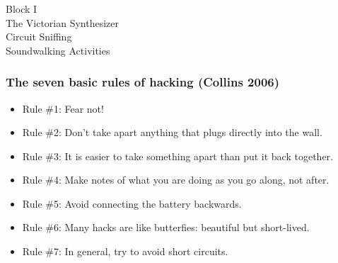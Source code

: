 \documentclass[screen, aspectratio=169]{beamer}
\begin{document}
\usebackgroundtemplate{}
\begin{frame}
\frametitle{}
{\huge Block I\\ The Victorian Synthesizer\\ Circuit Sniffing\\ Soundwalking Activities}
\end{frame}

\begin{frame}
  \frametitle{The seven basic rules of hacking (Collins 2006)}
        \begin{itemize}
	\item Rule \#1: Fear not!
	\item Rule \#2: Don't take apart anything that plugs directly into the wall.
	\item Rule \#3: It is easier to take something apart than put it back together.
	\item Rule \#4: Make notes of what you are doing as you go along, not after.
	\item Rule \#5: Avoid connecting the battery backwards.
	\item Rule \#6: Many hacks are like butterfies: beautiful but short-lived.
	\item Rule \#7: In general, try to avoid short circuits.
    \end{itemize} 
\end{frame}
%
\end{document}
